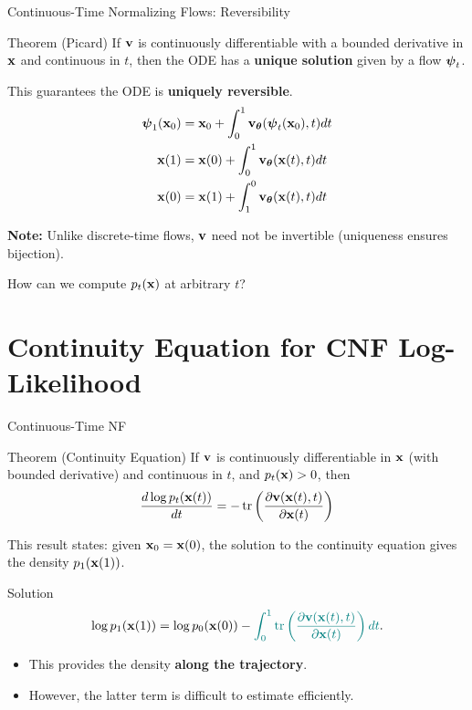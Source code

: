 \documentclass{beamer}
\renewcommand{\eqpause}{}
\begin{document}
\begin{frame}{Continuous-Time Normalizing Flows: Reversibility}
	\begin{block}{Theorem (Picard)}
		If $\mathbf{v}$ is continuously differentiable with a bounded derivative in $\mathbf{x}$ and continuous in $t$, then the ODE has a \textbf{unique solution} given by a flow $\boldsymbol{\psi}_t$.
	\end{block}
	\eqpause
	This guarantees the ODE is \textbf{uniquely reversible}. 
	\vspace{-0.3cm}
	\begin{align*}
		\boldsymbol{\psi}_1(\mathbf{x}_0) &= \mathbf{x}_0 + \int_{0}^{1} \mathbf{v}_{\boldsymbol{\theta}}(\boldsymbol{\psi}_t(\mathbf{x}_0), t) dt \\
		\mathbf{x}(1) &= \mathbf{x}(0) + \int_{0}^{1} \mathbf{v}_{\boldsymbol{\theta}}(\mathbf{x}(t), t) dt \\
		\mathbf{x}(0) &= \mathbf{x}(1) + \int_{1}^{0} \mathbf{v}_{\boldsymbol{\theta}}(\mathbf{x}(t), t) dt
	\end{align*}
	\eqpause
	\textbf{Note:} Unlike discrete-time flows, $\mathbf{v}$ need not be invertible (uniqueness ensures bijection).
	\eqpause
	How can we compute $p_t(\mathbf{x})$ at arbitrary $t$?
\end{frame}
\section{Continuity Equation for CNF Log-Likelihood}
\begin{frame}{Continuous-Time NF}
	\begin{block}{Theorem (Continuity Equation)}
		If $\mathbf{v}$ is continuously differentiable in $\mathbf{x}$ (with bounded derivative) and continuous in $t$, and $p_t(\mathbf{x}) > 0$, then
		\[
			\frac{d \log p_t(\mathbf{x}(t))}{d t} = - \operatorname{tr} \left( \frac{\partial \mathbf{v}(\mathbf{x}(t), t)}{\partial \mathbf{x}(t)} \right)
		\]
		\vspace{-0.3cm}
	\end{block}
	\eqpause
	This result states: given $\mathbf{x}_0 = \mathbf{x}(0)$, the solution to the continuity equation gives the density $p_1(\mathbf{x}(1))$.
	\begin{block}{Solution}
		\vspace{-0.3cm}
		\[
			\log p_1(\mathbf{x}(1)) = \log p_0(\mathbf{x}(0)) - {\color{teal}\int_{0}^{1} \operatorname{tr}  \left( \frac{\partial \mathbf{v}(\mathbf{x}(t), t)}{\partial \mathbf{x}(t)} \right) dt}.
		\]
		\vspace{-0.3cm}
	\end{block}
	\eqpause
	\begin{itemize}
		\item This provides the density \textbf{along the trajectory}.
		\item However, {\color{teal}the latter term} is difficult to estimate efficiently.
	\end{itemize}
\end{frame}
\end{document}
